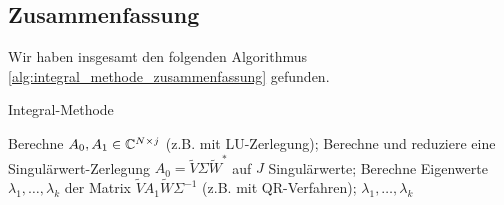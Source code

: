 \subsection*{Zusammenfassung}

Wir haben insgesamt den folgenden Algorithmus \ref{alg:integral_methode_zusammenfassung} gefunden.

\begin{algorithm}[H]
	\caption{Integral-Methode}
    \begin{algorithmic}[1]
            \State Berechne $A_0, A_1 \in \mathbb{C}^{N \times j}$ (z.B. mit LU-Zerlegung);
            \State Berechne und reduziere eine Singulärwert-Zerlegung $A_0 = \tilde V \Sigma \tilde W^\ast$ auf $J$ Singulärwerte;
            \State Berechne Eigenwerte $\lambda_1, \dots, \lambda_k$ der Matrix $\tilde V A_1 \tilde W \Sigma^{-1}$ (z.B. mit QR-Verfahren);
            \State \Return $\lambda_1, \dots, \lambda_k$
		\EndProcedure
    \end{algorithmic}
    \caption{}
    \label{alg:integral_methode_zusammenfassung}
\end{algorithm}
